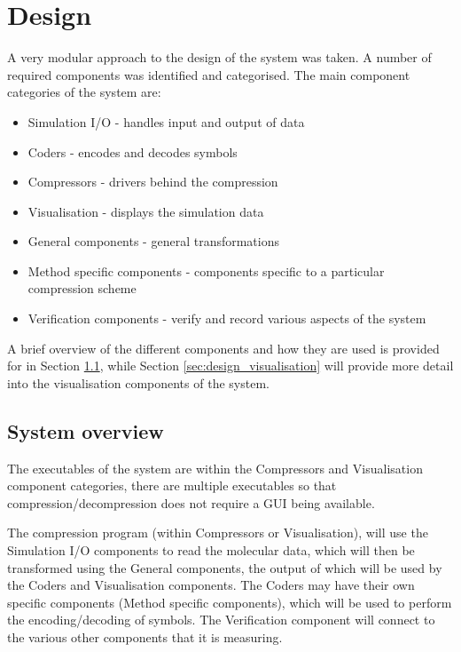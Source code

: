 \graphicspath{{./design/}}

\chapter{Design}
\label{cha:design}


A very modular approach to the design of the system was taken. A number of
required components was identified and categorised. The main component
categories of the system are:

\begin{itemize}
  \item Simulation I/O - handles input and output of data
  \item Coders - encodes and decodes symbols
  \item Compressors - drivers behind the compression
  \item Visualisation - displays the simulation data
  \item General components - general transformations
  \item Method specific components - components specific to a particular
  compression scheme
  \item Verification components - verify and record various aspects of the
  system
\end{itemize}

A brief overview of the different components and how they are used is provided
for in Section \ref{sec:design_overview}, while Section
\ref{sec:design_visualisation} will provide more detail into the
visualisation components of the system.


\section{System overview}
\label{sec:design_overview}

The executables of the system are within the Compressors and Visualisation
component categories, there are multiple executables so that
compression/decompression does not require a GUI being available.

The compression program (within Compressors or Visualisation), will use the
Simulation I/O components to read the molecular data, which will then be
transformed using the General components, the output of which will be used by
the Coders and Visualisation components. The Coders may have their own specific
components (Method specific components), which will be used to perform the
encoding/decoding of symbols. The Verification component will connect to the
various other components that it is measuring.

